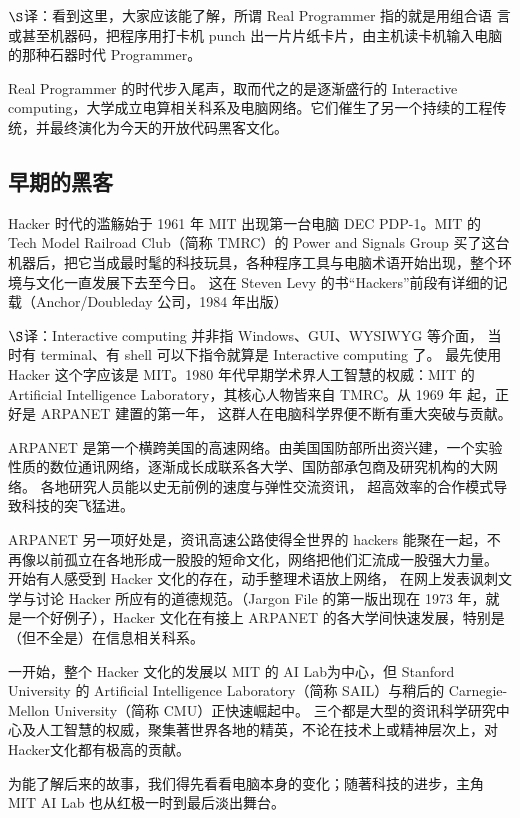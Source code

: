 $\S$译：看到这里，大家应该能了解，所谓 Real Programmer 指的就是用组合语 言或甚至机器码，把程序用打卡机 punch 出一片片纸卡片，由主机读卡机输入电脑的那种石器时代 Programmer。

Real Programmer 的时代步入尾声，取而代之的是逐渐盛行的 Interactive computing，大学成立电算相关科系及电脑网络。它们催生了另一个持续的工程传统，并最终演化为今天的开放代码黑客文化。

\subsection{早期的黑客}

Hacker 时代的滥觞始于 1961 年 MIT 出现第一台电脑 DEC PDP-1。MIT 的 Tech Model Railroad Club（简称 TMRC）的 Power and Signals Group 买了这台机器后，把它当成最时髦的科技玩具，各种程序工具与电脑术语开始出现，整个环境与文化一直发展下去至今日。 这在 Steven Levy 的书“Hackers”前段有详细的记载（Anchor/Doubleday 公司，1984 年出版）

$\S$译：Interactive computing 并非指 Windows、GUI、WYSIWYG 等介面， 当时有 terminal、有 shell 可以下指令就算是 Interactive computing 了。 最先使用 Hacker 这个字应该是 MIT。1980 年代早期学术界人工智慧的权威：MIT 的 Artificial Intelligence Laboratory，其核心人物皆来自 TMRC。从 1969 年 起，正好是 ARPANET 建置的第一年， 这群人在电脑科学界便不断有重大突破与贡献。

ARPANET 是第一个横跨美国的高速网络。由美国国防部所出资兴建，一个实验性质的数位通讯网络，逐渐成长成联系各大学、国防部承包商及研究机构的大网络。 各地研究人员能以史无前例的速度与弹性交流资讯， 超高效率的合作模式导致科技的突飞猛进。

ARPANET 另一项好处是，资讯高速公路使得全世界的 hackers 能聚在一起，不再像以前孤立在各地形成一股股的短命文化，网络把他们汇流成一股强大力量。 开始有人感受到 Hacker 文化的存在，动手整理术语放上网络， 在网上发表讽刺文学与讨论 Hacker 所应有的道德规范。（Jargon File 的第一版出现在 1973 年，就是一个好例子），Hacker 文化在有接上 ARPANET 的各大学间快速发展，特别是（但不全是）在信息相关科系。

一开始，整个 Hacker 文化的发展以 MIT 的 AI Lab为中心，但 Stanford University 的 Artificial Intelligence Laboratory（简称 SAIL）与稍后的 Carnegie-Mellon University（简称 CMU）正快速崛起中。 三个都是大型的资讯科学研究中心及人工智慧的权威，聚集著世界各地的精英，不论在技术上或精神层次上，对Hacker文化都有极高的贡献。

为能了解后来的故事，我们得先看看电脑本身的变化；随著科技的进步，主角 MIT AI Lab 也从红极一时到最后淡出舞台。

